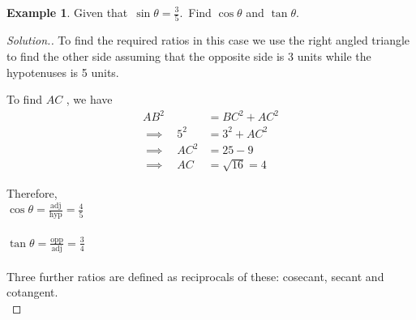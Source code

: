 \documentclass[11pt,a4paper]{article}
\theoremstyle{definition}
\newtheorem{example}[thm]{Example}
\newenvironment{solution}
  {\renewcommand{\qedsymbol}{}\begin{proof}[\textit{Solution}.]}
  {\end{proof}}
\begin{document}
\begin{example}

Given that $\, \sin \theta = \frac{3}{5}.\,$ Find $\cos \theta$ and $\tan \theta$.
\end{example}
\begin{solution}

To find the required ratios in this case we use the right angled triangle to find the other side assuming that the opposite side is 3 units while the hypotenuses is 5 units.




\begin{figure}[H]
\centering
{}
\end{figure}











To find $AC$ , we have 
\begin{align*}
AB^2 & = BC^2 + AC^2\\
\implies\quad  5^2 & = 3^2 + AC^2\\
\implies \quad  AC^2 &  = 25 - 9\\
\implies \quad  AC & = \sqrt{16} = 4
\end{align*}


Therefore,\\

$\cos \theta =  \frac{\text{adj}}{\text{hyp}} = \frac{4}{5}$\\\\

$\tan \theta = \frac{\text{opp}}{\text{adj}} = \frac{3}{4}$\\\\




Three further ratios are defined as reciprocals of these: cosecant, secant and cotangent.\\


\end{solution}
\end{document}
